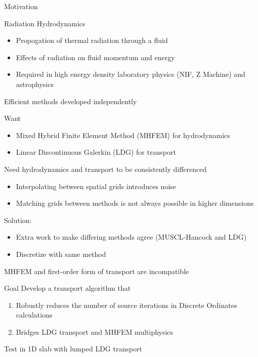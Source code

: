 \documentclass[10pt]{beamer}
\begin{document}
\begin{frame}{Motivation}

	\scriptsize
	Radiation Hydrodynamics 
	\vspace{-.1in}
	    \begin{itemize}
            \item Propogation of thermal radiation through a fluid 
            \item Effects of radiation on fluid momentum and energy 
	    	\item Required in high energy density laboratory physics (NIF, Z Machine) and astrophysics 
	    \end{itemize}
    \vspace{-.05in}

   	Efficient methods developed independently 

    Want
    \vspace{-.1in}
    \begin{itemize}
        \item Mixed Hybrid Finite Element Method (MHFEM) for hydrodynamics 
        \item Linear Discontinuous Galerkin (LDG) for transport 
    \end{itemize}
    \vspace{-0.05in}

    Need hydrodynamics and transport to be consistently differenced  
    \vspace{-.1in}
    \begin{itemize}
        \item Interpolating between spatial grids introduces noise 
        \item Matching grids between methods is not always possible in higher dimensions 
    \end{itemize}
    \vspace{-.05in}

    Solution: 
    \vspace{-.1in}
    \begin{itemize}
        \item Extra work to make differing methods agree (MUSCL-Hancock and LDG) 
        \item Discretize with same method
    \end{itemize}

    MHFEM and first-order form of transport are incompatible 

    \begin{block}{Goal}
        Develop a transport algorithm that 
            \begin{enumerate} \vspace{-.1in}
                \item Robustly reduces the number of source iterations in Discrete Ordinates calculations 
                \item Bridges LDG transport and MHFEM multiphysics
            \end{enumerate}
        \vspace{-.05in}
       	Test in 1D slab with lumped LDG transport  
    \end{block}

\end{frame}
\end{document}
